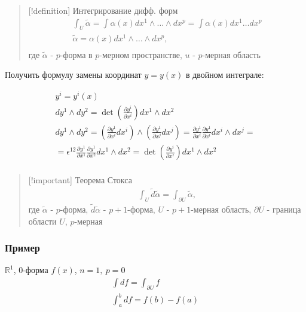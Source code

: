\begin{quote}
{[}!definition{]} Интегрирование дифф. форм $$\begin{gather}
\int _{U} \tilde{\alpha} = \int \alpha(x)dx^{1}\wedge \dots \wedge dx^{p} = \int \alpha(x)dx^{1}\dots dx^{p} \\
\tilde{\alpha} = \alpha(x)dx^{1}\wedge \dots \wedge dx^{p}, \\
\end{gather}$$ где \(\tilde{\alpha}\) - \(p\)-форма в \(p\)-мерном
пространстве, \(u\) - \(p\)-мерная область
\end{quote}

Получить формулу замены координат \(y = y(x)\) в двойном интеграле:

$$\begin{gather}
y^{i} = y^{i}(x) \\
dy^{1} \wedge dy^{2} = \det \left( \frac{\partial y^{i}}{\partial x^{i}} \right) dx^{1} \wedge dx^{2} \\
dy^{1} \wedge dy^{2} = \left( \frac{\partial y^{1}}{\partial x^{i}}dx^{i} \right) \wedge \left( \frac{\partial y^{1}}{\partial x^{j}}dx^{j} \right) = \frac{\partial y^{1}}{\partial x^{i}}\frac{\partial y^{1}}{\partial x^{i}} dx^{i} \wedge dx^{j} = \\
= \epsilon^{12}\frac{\partial y^{1}}{\partial x^{1}}\frac{\partial y^{1}}{\partial x^{2}} dx^{1} \wedge dx^{2} = \det \left( \frac{\partial y^{i}}{\partial x^{i}} \right) dx^{1} \wedge dx^{2} \\
\end{gather}$$

\begin{quote}
{[}!important{]} Теорема Стокса $$\begin{gather}
\int _{U} \tilde{d}\tilde{\alpha} = \int _{\partial U} \tilde{\alpha},
\end{gather}$$ где \(\tilde{\alpha}\) - \(p\)-форма,
\(\tilde{d}\tilde{\alpha}\) - \(p+1\)-форма, \(U\) - \(p+1\)-мерная
область, \(\partial U\) - граница области \(U\), \(p\)-мерная
\end{quote}

\subsubsection{Пример}

\(\mathbb{R}^{1}\), \(0\)-форма \(f(x)\), \(n=1, \ p=0\)
$$\begin{gather}
\int df = \int_{\partial U} f \\
\int_{a}^{b} df = f(b) - f(a)
\end{gather}$$

